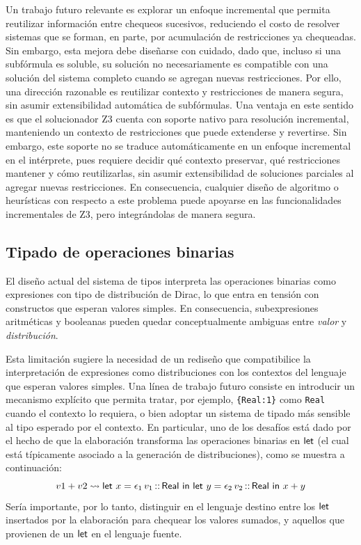 Un trabajo futuro relevante es explorar un enfoque incremental que
permita reutilizar información entre chequeos sucesivos, reduciendo el
costo de resolver sistemas que se forman, en parte, por acumulación de
restricciones ya chequeadas. Sin embargo, esta mejora debe diseñarse
con cuidado, dado que, incluso si una subfórmula es soluble, su
solución no necesariamente es compatible con una solución del sistema
completo cuando se agregan nuevas restricciones. Por ello, una
dirección razonable es reutilizar contexto y restricciones de manera
segura, sin asumir extensibilidad automática de
subfórmulas. Una ventaja en este sentido es que el solucionador Z3
  cuenta con soporte nativo para resolución incremental, manteniendo un
  contexto de restricciones que puede extenderse y revertirse. Sin
  embargo, este soporte no se traduce automáticamente en un enfoque
  incremental en el intérprete, pues requiere decidir qué contexto
  preservar, qué restricciones mantener y cómo reutilizarlas,
  sin asumir extensibilidad de soluciones parciales al agregar nuevas
  restricciones. En consecuencia, cualquier diseño de algoritmo o heurísticas
  con respecto a este problema puede apoyarse en las funcionalidades
  incrementales de Z3, pero integrándolas de manera segura.

\subsection{Tipado de operaciones binarias} El diseño
  actual del sistema de tipos interpreta las operaciones binarias como
  expresiones con tipo de distribución de Dirac, lo que entra en tensión con
  constructos que esperan valores simples. En consecuencia,
  subexpresiones aritméticas y booleanas pueden quedar conceptualmente
  ambiguas entre \emph{valor} y \emph{distribución}.

Esta limitación sugiere la necesidad de un rediseño que compatibilice
la interpretación de expresiones como distribuciones con los contextos
del lenguaje que esperan valores simples. Una línea de trabajo futuro
consiste en introducir un mecanismo explícito que permita tratar, por
ejemplo, \lstinline|{Real:1}| como \lstinline|Real| cuando el contexto
lo requiera, o bien adoptar un sistema de tipado más sensible al tipo
esperado por el contexto. En particular, uno de los desafíos está dado
por el hecho de que la elaboración transforma las operaciones binarias
en $\mathop{\text{\sffamily let}}$ (el cual está típicamente asociado a la generación de
distribuciones), como se muestra a continuación:
\begin{equation*}
  v1 + v2  \mathrel{\leadsto} \text{\sffamily let } {x} = {\epsilon_1\, v_1 \mathop{\text{\sffamily ::}} \mathord{\text{\sffamily Real}}} \text{\sffamily { in }} {\text{\sffamily let } {y} = {\epsilon_2\, v_2 \mathop{\text{\sffamily ::}}\mathord{\text{\sffamily Real}}} \text{\sffamily { in }} {x+y}}
\end{equation*}
Sería importante, por lo tanto, distinguir
en el lenguaje destino entre los $\mathop{\text{\sffamily let}}$ insertados
por la elaboración para chequear los valores
sumados, y aquellos que provienen de un $\mathop{\text{\sffamily let}}$ en el
lenguaje fuente.

